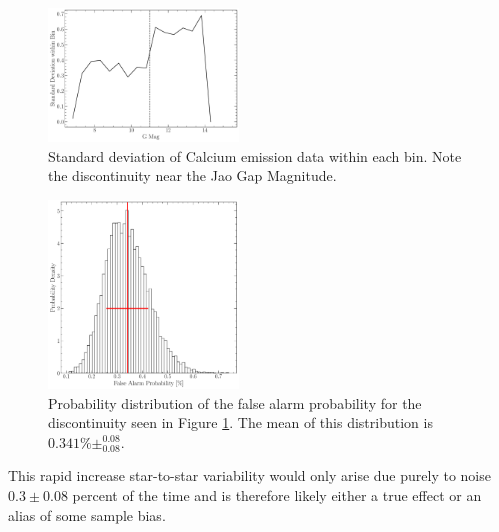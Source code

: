 \begin{figure}
  \centering
  \includegraphics[width=0.45\textwidth]{Deviation.pdf}
  \caption{Standard deviation of Calcium emission data within each bin. Note
  the discontinuity near the Jao Gap Magnitude.}
  \label{fig:deviation}
\end{figure}

\begin{figure}
  \centering
  \includegraphics[width=0.45\textwidth]{fpDist.pdf}
  \caption{Probability distribution of the false alarm probability for the
  discontinuity seen in Figure \ref{fig:deviation}. The mean of this
  distribution is $0.341\%\pm^{0.08}_{0.08}$.}
  \label{fig:dist}
\end{figure}

This rapid increase star-to-star variability would only arise due purely to
noise $0.3\pm0.08$ percent of the time and is therefore likely either a true
effect or an alias of some sample bias.

